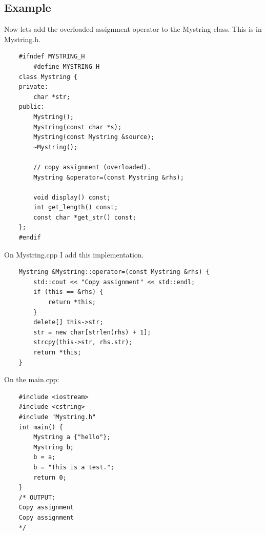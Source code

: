 \subsection{Example}
Now lets add the overloaded assignment operator to the Mystring class. This is in Mystring.h.
\begin{verbatim}
    #ifndef MYSTRING_H
        #define MYSTRING_H
    class Mystring {
    private:
        char *str;
    public:
        Mystring();
        Mystring(const char *s);
        Mystring(const Mystring &source);
        ~Mystring();

        // copy assignment (overloaded).
        Mystring &operator=(const Mystring &rhs); 

        void display() const;
        int get_length() const;
        const char *get_str() const;
    };
    #endif
\end{verbatim}
On Mystring.cpp I add this implementation.
\begin{verbatim}
    Mystring &Mystring::operator=(const Mystring &rhs) {
        std::cout << "Copy assignment" << std::endl;
        if (this == &rhs) {
            return *this;
        }
        delete[] this->str;
        str = new char[strlen(rhs) + 1];
        strcpy(this->str, rhs.str);
        return *this;
    }
\end{verbatim}
On the main.cpp:
\begin{verbatim}
    #include <iostream>
    #include <cstring>
    #include "Mystring.h"
    int main() {
        Mystring a {"hello"};
        Mystring b;
        b = a;
        b = "This is a test.";
        return 0;
    }
    /* OUTPUT:
    Copy assignment
    Copy assignment
    */
\end{verbatim}

